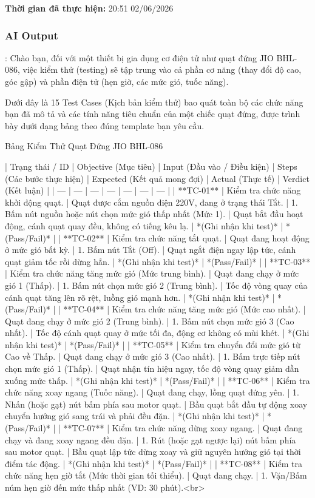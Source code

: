 \vspace{0.1cm}

\textbf{Thời gian đã thực hiện:} 20:51 02/06/2026

\subsubsection{AI Output}:
Chào bạn, đối với một thiết bị gia dụng cơ điện tử như quạt đứng JIO BHL-086, việc kiểm thử (testing) sẽ tập trung vào cả phần cơ năng (thay đổi độ cao, góc gập) và phần điện tử (hẹn giờ, các mức gió, tuốc năng).

Dưới đây là 15 Test Cases (Kịch bản kiểm thử) bao quát toàn bộ các chức năng bạn đã mô tả và các tính năng tiêu chuẩn của một chiếc quạt đứng, được trình bày dưới dạng bảng theo đúng template bạn yêu cầu.

Bảng Kiểm Thử Quạt Đứng JIO BHL-086

| Trạng thái / ID | Objective (Mục tiêu) | Input (Đầu vào / Điều kiện) | Steps (Các bước thực hiện) | Expected (Kết quả mong đợi) | Actual (Thực tế) | Verdict (Kết luận) |
| --- | --- | --- | --- | --- | --- | --- |
| **TC-01** | Kiểm tra chức năng khởi động quạt. | Quạt được cắm nguồn điện 220V, đang ở trạng thái Tắt. | 1. Bấm nút nguồn hoặc nút chọn mức gió thấp nhất (Mức 1). | Quạt bắt đầu hoạt động, cánh quạt quay đều, không có tiếng kêu lạ. | *(Ghi nhận khi test)* | *(Pass/Fail)* |
| **TC-02** | Kiểm tra chức năng tắt quạt. | Quạt đang hoạt động ở mức gió bất kỳ. | 1. Bấm nút Tắt (Off). | Quạt ngắt điện ngay lập tức, cánh quạt giảm tốc rồi dừng hẳn. | *(Ghi nhận khi test)* | *(Pass/Fail)* |
| **TC-03** | Kiểm tra chức năng tăng mức gió (Mức trung bình). | Quạt đang chạy ở mức gió 1 (Thấp). | 1. Bấm nút chọn mức gió 2 (Trung bình). | Tốc độ vòng quay của cánh quạt tăng lên rõ rệt, luồng gió mạnh hơn. | *(Ghi nhận khi test)* | *(Pass/Fail)* |
| **TC-04** | Kiểm tra chức năng tăng mức gió (Mức cao nhất). | Quạt đang chạy ở mức gió 2 (Trung bình). | 1. Bấm nút chọn mức gió 3 (Cao nhất). | Tốc độ cánh quạt quay ở mức tối đa, động cơ không có mùi khét. | *(Ghi nhận khi test)* | *(Pass/Fail)* |
| **TC-05** | Kiểm tra chuyển đổi mức gió từ Cao về Thấp. | Quạt đang chạy ở mức gió 3 (Cao nhất). | 1. Bấm trực tiếp nút chọn mức gió 1 (Thấp). | Quạt nhận tín hiệu ngay, tốc độ vòng quay giảm dần xuống mức thấp. | *(Ghi nhận khi test)* | *(Pass/Fail)* |
| **TC-06** | Kiểm tra chức năng xoay ngang (Tuốc năng). | Quạt đang chạy, lồng quạt đứng yên. | 1. Nhấn (hoặc gạt) nút bấm phía sau motor quạt. | Bầu quạt bắt đầu tự động xoay chuyển hướng gió sang trái và phải đều đặn. | *(Ghi nhận khi test)* | *(Pass/Fail)* |
| **TC-07** | Kiểm tra chức năng dừng xoay ngang. | Quạt đang chạy và đang xoay ngang đều đặn. | 1. Rút (hoặc gạt ngược lại) nút bấm phía sau motor quạt. | Bầu quạt lập tức dừng xoay và giữ nguyên hướng gió tại thời điểm tác động. | *(Ghi nhận khi test)* | *(Pass/Fail)* |
| **TC-08** | Kiểm tra chức năng hẹn giờ tắt (Mức thời gian tối thiểu). | Quạt đang chạy. | 1. Vặn/Bấm núm hẹn giờ đến mức thấp nhất (VD: 30 phút).<br>

